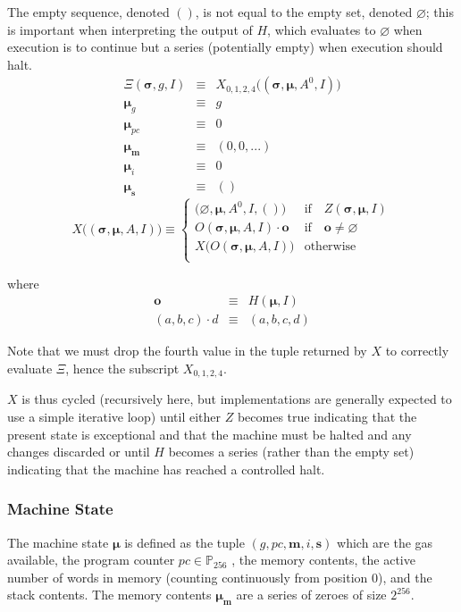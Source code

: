 \documentclass[9pt,oneside]{amsart}
\begin{document}
\begin{multicols}{2}
The empty sequence, denoted $()$, is not equal to the empty set, denoted $\varnothing$; this is important when interpreting the output of $H$, which evaluates to $\varnothing$ when execution is to continue but a series (potentially empty) when execution should halt.
\begin{eqnarray}
\Xi(\boldsymbol{\sigma}, g, I) & \equiv & X_{0,1,2,4}\big((\boldsymbol{\sigma}, \boldsymbol{\mu}, A^0, I)\big) \\
\boldsymbol{\mu}_g & \equiv & g \\
\boldsymbol{\mu}_{pc} & \equiv & 0 \\
\boldsymbol{\mu}_\mathbf{m} & \equiv & (0, 0, ...) \\
\boldsymbol{\mu}_i & \equiv & 0 \\
\boldsymbol{\mu}_\mathbf{s} & \equiv & ()
\end{eqnarray}
\begin{equation}
X\big( (\boldsymbol{\sigma}, \boldsymbol{\mu}, A, I) \big) \equiv \begin{cases}
\big(\varnothing, \boldsymbol{\mu}, A^0, I, ()\big) & \text{if} \quad Z(\boldsymbol{\sigma}, \boldsymbol{\mu}, I)\\
O(\boldsymbol{\sigma}, \boldsymbol{\mu}, A, I) \cdot \mathbf{o} & \text{if} \quad \mathbf{o} \neq \varnothing\\
X\big(O(\boldsymbol{\sigma}, \boldsymbol{\mu}, A, I)\big) & \text{otherwise}\\
\end{cases}
\end{equation}

where
\begin{eqnarray}
\mathbf{o} & \equiv & H(\boldsymbol{\mu}, I) \\
(a, b, c) \cdot d & \equiv & (a, b, c, d)
\end{eqnarray}

Note that we must drop the fourth value in the tuple returned by $X$ to correctly evaluate $\Xi$, hence the subscript $X_{0,1,2,4}$.

$X$ is thus cycled (recursively here, but implementations are generally expected to use a simple iterative loop) until either $Z$ becomes true indicating that the present state is exceptional and that the machine must be halted and any changes discarded or until $H$ becomes a series (rather than the empty set) indicating that the machine has reached a controlled halt.

\subsubsection{Machine State}
The machine state $\boldsymbol{\mu}$ is defined as the tuple $(g, pc, \mathbf{m}, i, \mathbf{s})$ which are the gas available, the program counter $pc \in \mathbb{P}_{256}$ , the memory contents, the active number of words in memory (counting continuously from position 0), and the stack contents. The memory contents $\boldsymbol{\mu}_\mathbf{m}$ are a series of zeroes of size $2^{256}$.


\end{multicols}
\end{document}
